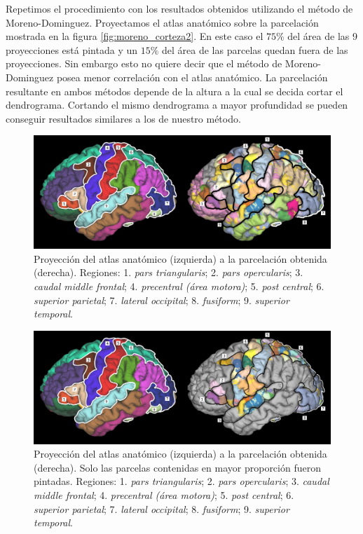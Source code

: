 Repetimos el procedimiento con los resultados obtenidos utilizando el 
m\'etodo de Moreno-Dominguez. Proyectamos el atlas anat\'omico sobre la
parcelaci\'on mostrada en la figura \ref{fig:moreno_corteza2}.
En este caso el $75\%$ del \'area de las 9 proyecciones est\'a pintada y 
un $15\%$ del \'area de las parcelas quedan fuera de las proyecciones. 
Sin embargo esto no quiere decir que el m\'etodo de Moreno-Dominguez 
posea menor correlaci\'on con el atlas anat\'omico. La parcelaci\'on 
resultante en ambos m\'etodos depende de la altura a la cual se decida 
cortar el dendrograma. Cortando el mismo dendrograma a mayor profundidad
se pueden conseguir resultados similares a los de nuestro m\'etodo.\\

\begin{figure}[h!]
    \includegraphics[width=\textwidth]{img/anatomica2parcelation.png}
    \caption{Proyecci\'on del atlas anat\'omico (izquierda) a la 
             parcelaci\'on obtenida (derecha). Regiones: 
             1. \textit{pars triangularis}; 2. \textit{pars opercularis};
             3. \textit{caudal middle frontal}; 
             4. \textit{precentral (\'area motora)}; 
             5. \textit{post central}; 6. \textit{superior parietal}; 
             7. \textit{lateral occipital}; 8. \textit{fusiform};
             9. \textit{superior temporal}.  }
    \label{fig:an2pa}
\end{figure}

\begin{figure}[h!]
    \includegraphics[width=\textwidth]{img/anatomica2parcelation2.png}
    \caption{Proyecci\'on del atlas anat\'omico (izquierda) a la 
             parcelaci\'on obtenida (derecha). Solo las parcelas contenidas
             en mayor proporci\'on fueron pintadas. Regiones: 
             1. \textit{pars triangularis}; 2. \textit{pars opercularis};
             3. \textit{caudal middle frontal}; 
             4. \textit{precentral (\'area motora)}; 
             5. \textit{post central}; 6. \textit{superior parietal}; 
             7. \textit{lateral occipital}; 8. \textit{fusiform};
             9. \textit{superior temporal}.  }
    \label{fig:an2pa2}
\end{figure}

